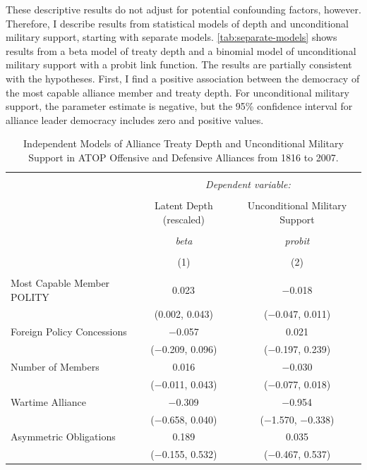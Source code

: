 \documentclass[12pt]{article}
\begin{document}
These descriptive results do not adjust for potential confounding factors, however.
Therefore, I describe results from statistical models of depth and unconditional military support, starting with separate models. 
\autoref{tab:separate-models} shows results from a beta model of treaty depth and a binomial model of unconditional military support with a probit link function. 
The results are partially consistent with the hypotheses.
First, I find a positive association between the democracy of the most capable alliance member and treaty depth. 
For unconditional military support, the parameter estimate is negative, but the 95\% confidence interval for alliance leader democracy includes zero and positive values. 


\begin{table}[!htbp] \centering 
  \caption{Independent Models of Alliance Treaty Depth and Unconditional Military Support in ATOP Offensive and Defensive Alliances from 1816 to 2007.} 
  \label{tab:separate-models} 
\begin{tabular}{@{\extracolsep{5pt}}lcc} 
\\[-1.8ex]\hline 
\hline \\[-1.8ex] 
 & \multicolumn{2}{c}{\textit{Dependent variable:}} \\ 
\cline{2-3} 
\\[-1.8ex] & Latent Depth (rescaled) & Unconditional Military Support \\ 
\\[-1.8ex] & \textit{beta} & \textit{probit} \\ 
\\[-1.8ex] & (1) & (2)\\ 
\hline \\[-1.8ex] 
  Most Capable Member POLITY & 0.023$^{}$ & $-$0.018 \\ 
  & (0.002, 0.043) & ($-$0.047, 0.011) \\ 
  Foreign Policy Concessions & $-$0.057 & 0.021 \\ 
  & ($-$0.209, 0.096) & ($-$0.197, 0.239) \\ 
  Number of Members & 0.016 & $-$0.030 \\ 
  & ($-$0.011, 0.043) & ($-$0.077, 0.018) \\ 
  Wartime Alliance & $-$0.309$^{}$ & $-$0.954$^{}$ \\ 
  & ($-$0.658, 0.040) & ($-$1.570, $-$0.338) \\ 
  Asymmetric Obligations & 0.189 & 0.035 \\ 
  & ($-$0.155, 0.532) & ($-$0.467, 0.537) \\ 

\end{tabular}
\end{table}
\end{document}
